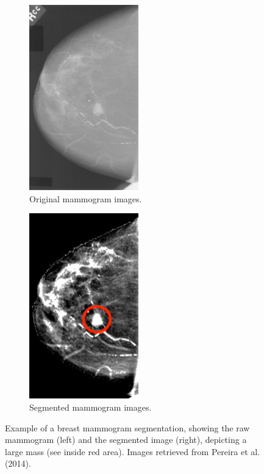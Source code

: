 \begin{figure}[h]
\centering
\begin{subfigure}{.5\textwidth}
  \centering
  \includegraphics[width=0.52\textwidth]{Dissertation/figures/litsurvey/original-mammogram.jpg}
  \caption{Original mammogram images.}
  \label{fig:original-mammogram}
\end{subfigure}%
\begin{subfigure}{.5\textwidth}
  \centering
  \includegraphics[width=0.52\textwidth]{Dissertation/figures/litsurvey/segmented-mammogram.jpg}
  \caption{Segmented mammogram images.}
  \label{fig:segmented-mammogram}
\end{subfigure}
\caption{\label{fig:segmentation_example}Example of a breast mammogram segmentation, showing the raw mammogram (left) and the segmented image (right), depicting a large mass (see inside red area). Images retrieved from Pereira et al. (2014).}
\end{figure}

